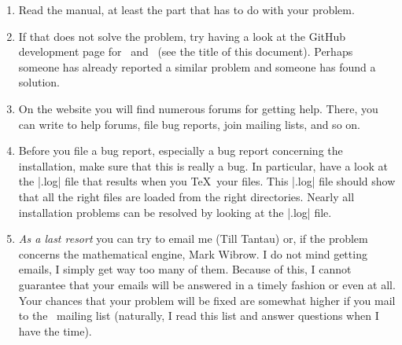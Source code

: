 \begin{enumerate}
    \item Read the manual, at least the part that has to do with your
        problem.
    \item If that does not solve the problem, try having a look at the
        GitHub development page for \pgfname\ and \tikzname\ (see the
        title of this document). Perhaps someone has already reported a
        similar problem and someone has found a solution.
    \item On the website you will find numerous forums for getting help.
        There, you can write to help forums, file bug reports, join mailing
        lists, and so on.
    \item Before you file a bug report, especially a bug report concerning
        the installation, make sure that this is really a bug. In particular,
        have a look at the |.log| file that results when you \TeX\ your
        files. This |.log| file should show that all the right files are
        loaded from the right directories. Nearly all installation problems
        can be resolved by looking at the |.log| file.
    \item \emph{As a last resort} you can try to email me (Till Tantau) or,
        if the problem concerns the mathematical engine, Mark Wibrow. I do
        not mind getting emails, I simply get way too many of them. Because
        of this, I cannot guarantee that your emails will be answered in a 
        timely fashion or even at all. Your chances that your problem will
        be fixed are somewhat higher if you mail to the \pgfname\ mailing
        list (naturally, I read this list and answer questions when I have
        the time).
\end{enumerate}

